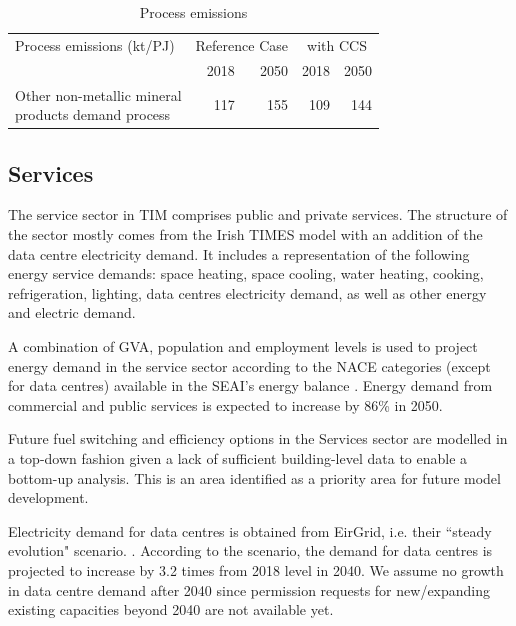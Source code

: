 \documentclass[journal abbreviation, manuscript]{copernicus}
\begin{document}


\begin{table}[htbp]
\footnotesize
 \centering
 \caption{Process emissions}
 \begin{tabular}{lrrrr}
 \hline
 Process emissions (kt/PJ) & \multicolumn{2}{c}{Reference Case} & \multicolumn{2}{c}{with CCS} \\
 & 2018 & 2050 & 2018 & 2050 \\ \hline
 \makecell{Other non-metallic mineral \\ products demand process} & 117 & 155 & 109 & 144 \\ \hline
 \end{tabular}%
 \label{tab:addlabel}%
\end{table}%


\subsection{Services}
\label{ss:services}
The service sector in TIM comprises public and private services. The structure of the sector mostly comes from the Irish TIMES model with an addition of the data centre electricity demand. It includes a representation of the following energy service demands: space heating, space cooling, water heating, cooking, refrigeration, lighting, data centres electricity demand, as well as other energy and electric demand.

A combination of GVA, population and employment levels is used to project energy demand in the service sector according to the NACE categories (except for data centres) available in the SEAI's energy balance \citep{SEAI2019}. Energy demand from commercial and public services is expected to increase by 86\% in 2050. 

Future fuel switching and efficiency options in the Services sector are modelled in a top-down fashion given a lack of sufficient building-level data to enable a bottom-up analysis. This is an area identified as a priority area for future model development. 

Electricity demand for data centres is obtained from EirGrid, i.e. their ``steady evolution" scenario. \citep{EirGridT57:online}. According to the scenario, the demand for data centres is projected to increase by 3.2 times from 2018 level in 2040. We assume no growth in data centre demand after 2040 since permission requests for new/expanding existing capacities beyond 2040 are not available yet. 
\end{document}
